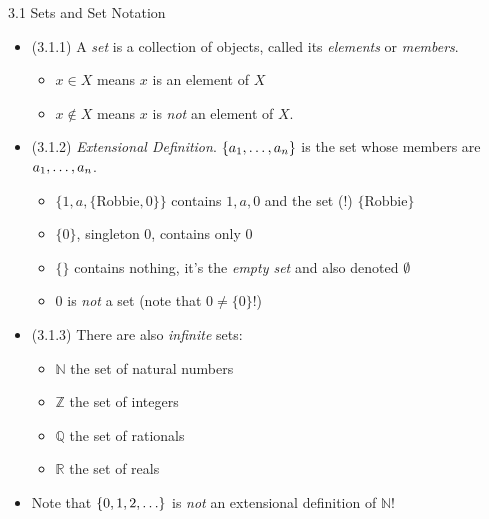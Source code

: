 \documentclass[../slides.tex]{subfiles}
\begin{document}
\begin{frame}{3.1 Sets and Set Notation}

	\begin{itemize}
	
		\item (3.1.1) A \emph{set} is a collection of objects, called its \emph{elements} or \emph{members}.
		
		\begin{itemize}
		
			\item $x\in X$ means $x$ is an element of $X$
			
			\item $x\notin X$ means $x$ is \emph{not} an element of $X$.
		
		\end{itemize}
		
		\item (3.1.2) \emph{Extensional Definition}. $\{a_1, \mathellipsis, a_n\}$ is the set whose members are $a_1, \mathellipsis, a_n$.
		
		\begin{itemize}
		
			\item  $\{1,a, \{\text{Robbie},0\}\}$ contains $1,a,0$ and the set (!) $ \{\text{Robbie}\}$
			
			\item $\{0\}$, singleton 0, contains only $0$			
			\item $\{ \}$ contains nothing, it's the \emph{empty set} and also denoted $\emptyset$
			
			\item $0$ is \emph{not} a set (note that $0\neq \{0\}$!)
		
		\end{itemize}

		\item (3.1.3) There are also \emph{infinite} sets:		
		
			\begin{itemize}
			
				\item $\mathbb{N}$ the set of natural numbers
				
				\item $\mathbb{Z}$ the set of integers
				
				\item $\mathbb{Q}$ the set of rationals
				
				\item $\mathbb{R}$ the set of reals
			
			\end{itemize} 
			
		\item Note that  $\{0,1,2,\mathellipsis\}$ is \emph{not} an extensional definition of $\mathbb{N}$! 
		
	\end{itemize}

\end{frame}
\end{document}
